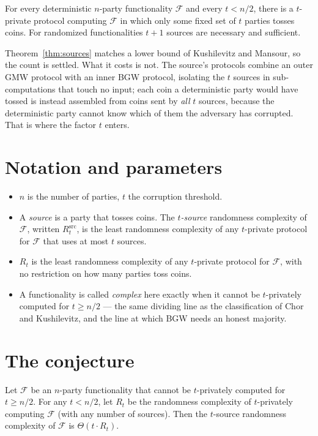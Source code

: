 \documentclass{aicr-conjecture}
\newcommand{\Fn}{\mathcal{F}}
\newcommand{\Rt}{R_{t}}
\newcommand{\Rts}{R^{\mathrm{src}}_{t}}
\begin{document}
\begin{theorem}\label{thm:sources}
For every deterministic $n$-party functionality $\Fn$ and every
$t < n/2$, there is a $t$-private protocol computing $\Fn$ in which only
some fixed set of $t$ parties tosses coins. For randomized
functionalities $t+1$ sources are necessary and sufficient.
\end{theorem}

Theorem~\ref{thm:sources} matches a lower bound of Kushilevitz and Mansour,
so the count is settled. What it costs is not. The source's protocols
combine an outer GMW protocol with an inner BGW protocol, isolating the
$t$ sources in sub-computations that touch no input; each coin a
deterministic party would have tossed is instead assembled from coins sent
by \emph{all} $t$ sources, because the deterministic party cannot know
which of them the adversary has corrupted. That is where the factor $t$
enters.

\section{Notation and parameters}\label{sec:notation}

\begin{itemize}[nosep]
  \item $n$ is the number of parties, $t$ the corruption threshold.
  \item A \emph{source} is a party that tosses coins. The
    \emph{$t$-source} randomness complexity of $\Fn$, written $\Rts$, is
    the least randomness complexity of any $t$-private protocol for
    $\Fn$ that uses at most $t$ sources.
  \item $\Rt$ is the least randomness complexity of any $t$-private
    protocol for $\Fn$, with no restriction on how many parties toss
    coins.
  \item A functionality is called \emph{complex} here exactly when it
    cannot be $t$-privately computed for $t \ge n/2$ --- the same
    dividing line as the classification of Chor and Kushilevitz, and the
    line at which BGW needs an honest majority.
\end{itemize}

\section{The conjecture}\label{sec:conjectures}

\begin{conjecture}[{\cite[Conjecture 13]{CR23}}]\label{conj:main}
Let $\Fn$ be an $n$-party functionality that cannot be $t$-privately
computed for $t \ge n/2$. For any $t < n/2$, let $\Rt$ be the randomness
complexity of $t$-privately computing $\Fn$ (with any number of sources).
Then the $t$-source randomness complexity of $\Fn$ is $\Theta(t \cdot
\Rt)$.
\end{conjecture}
\end{document}

